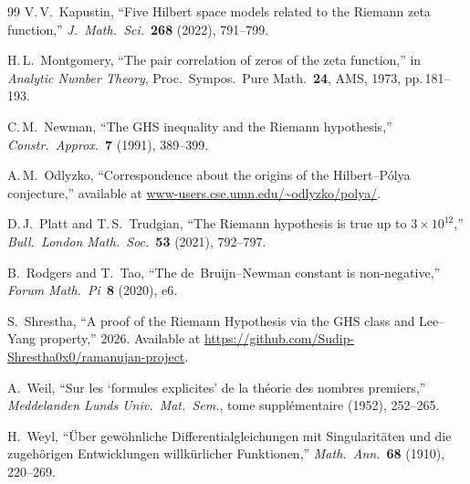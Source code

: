 \documentclass[11pt,a4paper]{amsart}
\theoremstyle{definition}
\theoremstyle{remark}
\begin{document}
\begin{thebibliography}{99}
 V.\,V.~Kapustin, ``Five Hilbert space models related to the Riemann zeta function,'' \emph{J.\ Math.\ Sci.}~\textbf{268} (2022), 791--799.

 H.\,L.~Montgomery, ``The pair correlation of zeros of the zeta function,'' in \emph{Analytic Number Theory}, Proc.\ Sympos.\ Pure Math.~\textbf{24}, AMS, 1973, pp.\,181--193.

 C.\,M.~Newman, ``The GHS inequality and the Riemann hypothesis,'' \emph{Constr.\ Approx.}~\textbf{7} (1991), 389--399.

 A.\,M.~Odlyzko, ``Correspondence about the origins of the Hilbert--P\'olya conjecture,'' available at \url{www-users.cse.umn.edu/~odlyzko/polya/}.

 D.\,J.~Platt and T.\,S.~Trudgian, ``The Riemann hypothesis is true up to $3\times 10^{12}$,'' \emph{Bull.\ London Math.\ Soc.}~\textbf{53} (2021), 792--797.

 B.~Rodgers and T.~Tao, ``The de~Bruijn--Newman constant is non-negative,'' \emph{Forum Math.\ Pi}~\textbf{8} (2020), e6.

 S.~Shrestha, ``A proof of the Riemann Hypothesis via the GHS class and Lee--Yang property,'' 2026. Available at \url{https://github.com/Sudip-Shrestha0x0/ramanujan-project}.

 A.~Weil, ``Sur les `formules explicites' de la th\'eorie des nombres premiers,'' \emph{Meddelanden Lunds Univ.\ Mat.\ Sem.}, tome suppl\'ementaire (1952), 252--265.

 H.~Weyl, ``\"Uber gew\"ohnliche Differentialgleichungen mit Singularit\"aten und die zugeh\"origen Entwicklungen willk\"urlicher Funktionen,'' \emph{Math.\ Ann.}~\textbf{68} (1910), 220--269.

\end{thebibliography}
\end{document}
